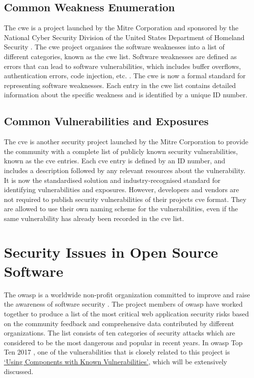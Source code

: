 \documentclass[12pt, a4paper]{report}
\begin{document}
\subsection{Common Weakness Enumeration}
The \acrfull{cwe} is a project launched by the Mitre Corporation and sponsored by the National Cyber
Security Division of the United States Department of Homeland Security \cite{cwe}. The
\acrshort{cwe} project organises the software weaknesses into a list of different categories, known
as the \acrshort{cwe} list. Software weaknesses are defined as errors that can lead to software
vulnerabilities, which includes buffer overflows, authentication errors, code injection, etc.
\cite{cwe_faq}. The \acrshort{cwe} is now a formal standard for representing software weaknesses.
Each entry in the \acrshort{cwe} list contains detailed information about the specific weakness and
is identified by a unique ID number.

\subsection{Common Vulnerabilities and Exposures}
The \acrfull{cve} is another security project launched by the Mitre Corporation \cite{cve} to
provide the community with a complete list of publicly known security vulnerabilities, known as the
\acrshort{cve} entries. Each \acrshort{cve} entry is defined by an ID number, and includes a
description followed by any relevant resources about the vulnerability. It is now the standardised
solution and industry-recognised standard for identifying vulnerabilities and exposures. However,
developers and vendors are not required to publish security vulnerabilities of their projects
\acrshort{cve} format. They are allowed to use their own naming scheme for the vulnerabilities, even
if the same vulnerability has already been recorded in the \acrshort{cve} list.

\section{Security Issues in Open Source Software}
The \acrfull{owasp} is a worldwide non-profit organization committed to improve and raise the
awareness of software security \cite{owasp_home}. The project members of \acrshort{owasp} have
worked together to produce a list of the most critical web application security risks based on the
community feedback and comprehensive data contributed by different organizations. The list consists
of ten categories of security attacks which are considered to be the most dangerous and popular in
recent years. In \acrshort{owasp} Top Ten 2017 \cite{owasp_top10}, one of the vulnerabilities that
is closely related to this project is \hyperref[subsec:components]{`Using Components with Known
Vulnerabilities'}, which will be extensively discussed.
\end{document}
